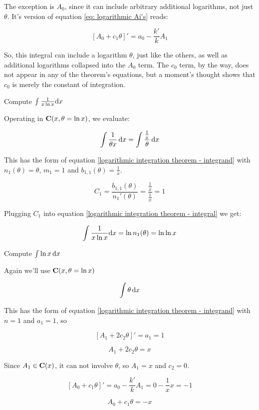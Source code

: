 The exception is $A_0$, since it can include arbitrary additional
logarithms, not just $\theta$.  It's version of equation
\eqref{eq: logarithmic Ai's} reads:

\begin{equation}
\left[ A_0 + c_1 \theta \right]' = a_0 - \frac{k'}{k} A_1
\end{equation}

So, this integral can include a logarithm $\theta$, just like the
others, as well as additional logarithms collapsed into the $A_0$
term.  The $c_0$ term, by the way, does not appear in any of the
theorem's equations, but a moment's thought shows that $c_0$ is
merely the constant of integration.

\vfill\eject

\example Compute $\int {1\over{x \ln x}} {\rm d}x$

Operating in ${\bf C}(x, \theta = \ln x)$, we evaluate:

$$\int {1\over{\theta x}} \,\mathrm{d} x = \int {{1\over x}\over{\theta}} \,\mathrm{d} x$$

This has the form of equation \eqref{logarithmic integration theorem - integrand}
with $n_1(\theta) = \theta$, $m_1 = 1$ and $b_{1,1}(\theta) = \frac{1}{x}$.

$$C_1 = \frac{b_{1,1}(\theta)}{n_1'(\theta)} = \frac{\frac{1}{x}}{\frac{1}{x}} = 1$$

Plugging $C_1$ into equation \eqref{logarithmic integration theorem - integral} we get:

$$\int {1\over{x \ln x}} {\rm d}x = \ln n_1(\theta) = \ln \ln x$$

\endexample

\example
\label{ex: integrate ln x}
Compute $\int \ln x \,{\rm d}x$

Again we'll use ${\bf C}(x, \theta = \ln x)$

$$\int \theta \,\mathrm{d} x$$

This has the form of equation \eqref{logarithmic integration theorem - integrand}
with $n=1$ and $a_1 = 1$, so

$$\left[ A_1 + 2 c_2 \theta \right]' = a_1 = 1$$

$$A_1 + 2 c_2 \theta = x$$

Since $A_1 \in {\bf C}(x)$, it can not involve $\theta$, so $A_1 = x$ and $c_2 = 0$.

$$\left[ A_0 + c_1 \theta \right]' = a_0 - \frac{k'}{k} A_1 = 0 - \frac{1}{x} x = -1$$

$$A_0 + c_1 \theta = -x$$

